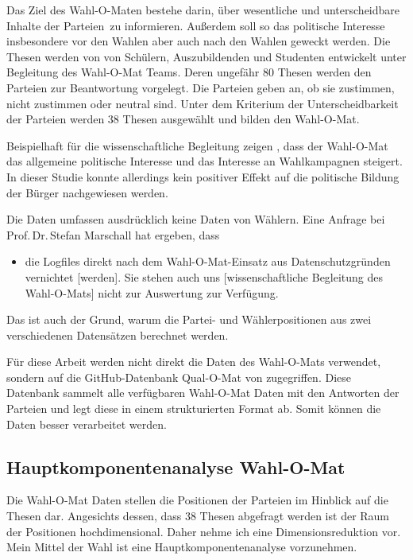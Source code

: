 Das Ziel des Wahl-O-Maten bestehe darin, über \glqq wesentliche und unterscheidbare Inhalte der Parteien\grqq\ zu informieren. Außerdem soll so das politische Interesse insbesondere vor den Wahlen aber auch nach den Wahlen geweckt werden. 
Die Thesen werden von von Schülern, Auszubildenden und Studenten entwickelt unter Begleitung des Wahl-O-Mat Teams. Deren ungefähr 80 Thesen werden den Parteien zur Beantwortung vorgelegt. Die Parteien geben an, ob sie zustimmen, nicht zustimmen oder neutral sind. Unter dem Kriterium der Unterscheidbarkeit der Parteien werden  38 Thesen ausgewählt und bilden den Wahl-O-Mat.
\citep{marschall2022wahlomatFAQ}%

Beispielhaft für die wissenschaftliche Begleitung zeigen \citet{heinsohn2019effects}, dass der Wahl-O-Mat das allgemeine politische Interesse und das Interesse an Wahlkampagnen steigert. In dieser Studie konnte allerdings kein positiver Effekt auf die politische Bildung der Bürger nachgewiesen werden. \citep[S.\,257-258]{heinsohn2019effects}

Die Daten umfassen ausdrücklich keine Daten von Wählern. Eine Anfrage bei Prof.\,Dr.\,Stefan Marschall hat ergeben, dass
\begin{itemize}
	\item[] \glqq die Logfiles direkt nach dem Wahl-O-Mat-Einsatz aus Datenschutzgründen vernichtet [werden]. Sie stehen auch uns [wissenschaftliche Begleitung des Wahl-O-Mats] nicht zur Auswertung zur Verfügung.\grqq
\end{itemize}
Das ist auch der Grund, warum die Partei- und Wählerpositionen aus zwei verschiedenen Datensätzen berechnet werden.

Für diese Arbeit werden nicht direkt die Daten des Wahl-O-Mats verwendet, sondern auf die GitHub-Datenbank Qual-O-Mat von \citet{Bolte2022QualOMat} zugegriffen. Diese Datenbank sammelt alle verfügbaren Wahl-O-Mat Daten mit den Antworten der Parteien und legt diese in einem strukturierten Format ab.
Somit können die Daten besser verarbeitet werden.

\subsection{Hauptkomponentenanalyse Wahl-O-Mat}\label{sec:Hauptkomponentenanalyse}

Die Wahl-O-Mat Daten stellen die Positionen der Parteien im Hinblick auf die Thesen dar. Angesichts dessen, dass 38 Thesen abgefragt werden ist der Raum der Positionen hochdimensional. Daher nehme ich eine Dimensionsreduktion vor. Mein Mittel der Wahl ist eine Hauptkomponentenanalyse vorzunehmen.

